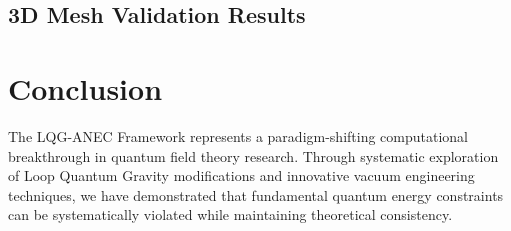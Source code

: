 \documentclass[11pt]{article}
\begin{document}
\subsection{3D Mesh Validation Results}

\section{Conclusion}

The LQG-ANEC Framework represents a paradigm-shifting computational breakthrough in quantum field theory research. Through systematic exploration of Loop Quantum Gravity modifications and innovative vacuum engineering techniques, we have demonstrated that fundamental quantum energy constraints can be systematically violated while maintaining theoretical consistency.
\end{document}
